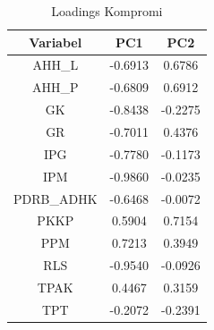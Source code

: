 \begin{table}[H]
\centering
\caption{Loadings Kompromi} \label{tab:loadings}
\begin{tabular}{|c|c|c|}
\hline
\textbf{Variabel} & \textbf{PC1} & \textbf{PC2} \\
\hline
AHH\_L & -0.6913 & 0.6786 \\
AHH\_P & -0.6809 & 0.6912 \\
GK & -0.8438 & -0.2275 \\
GR & -0.7011 & 0.4376 \\
IPG & -0.7780 & -0.1173 \\
IPM & -0.9860 & -0.0235 \\
PDRB\_ADHK & -0.6468 & -0.0072 \\
PKKP & 0.5904 & 0.7154 \\
PPM & 0.7213 & 0.3949 \\
RLS & -0.9540 & -0.0926 \\
TPAK & 0.4467 & 0.3159 \\
TPT & -0.2072 & -0.2391 \\
\hline
\end{tabular}
\end{table}